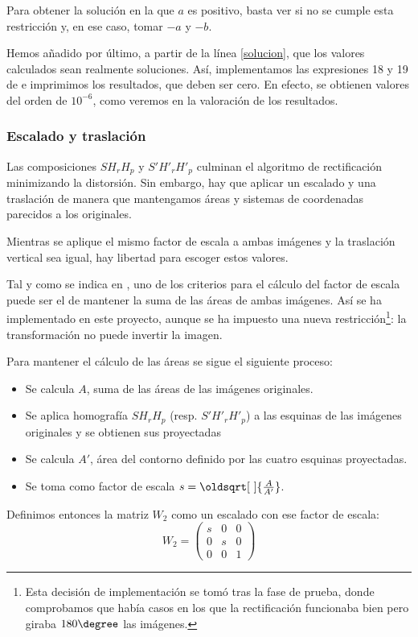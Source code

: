 \documentclass[a4paper, 11pt]{article}
\theoremstyle{definition}
\renewcommand*{\sqrt}[2][\ ]{\oldsqrt[#1]{#2} }
\begin{document}
    Para obtener la solución en la que $a$ es positivo, basta ver si no se cumple esta restricción y, en ese caso, tomar $-a$ y $-b$.

    Hemos añadido por último, a partir de la línea \ref{solucion}, que los valores calculados sean realmente soluciones. Así, implementamos las expresiones 18 y 19 de \cite{LoopZhang} e imprimimos los resultados, que deben ser cero. En efecto, se obtienen valores del orden de $10^{-6}$, como veremos en la valoración de los resultados.

    \subsubsection{Escalado y traslación}
    Las composiciones $S H_r H_p$ y $S' H'_r H'_p$ culminan el algoritmo de rectificación minimizando la distorsión. Sin embargo, hay que aplicar un escalado y una traslación de manera que mantengamos áreas y sistemas de coordenadas parecidos a los originales.

    Mientras se aplique el mismo factor de escala a ambas imágenes y la traslación vertical sea igual, hay libertad para escoger estos valores.

    Tal y como se indica en \cite{LoopZhang}, uno de los criterios para el cálculo del factor de escala puede ser el de mantener la suma de las áreas de ambas imágenes. Así se ha implementado en este proyecto, aunque se ha impuesto una nueva restricción\footnote{Esta decisión de implementación se tomó tras la fase de prueba, donde comprobamos que había casos en los que la rectificación funcionaba bien pero giraba $180\degree$ las imágenes.}: la transformación no puede invertir la imagen.

    Para mantener el cálculo de las áreas se sigue el siguiente proceso:
    \begin{itemize}
        \item Se calcula $A$, suma de las áreas de las imágenes originales.
        \item Se aplica homografía $S H_r H_p$ (resp. $S' H'_r H'_p$) a las esquinas de las imágenes originales y se obtienen sus proyectadas
        \item Se calcula $A'$, área del contorno definido por las cuatro esquinas proyectadas.
        \item Se toma como factor de escala $s = \sqrt{\frac{A}{A'}}$.
    \end{itemize}

    Definimos entonces la matriz $W_2$ como un escalado con ese factor de escala:
    \[
    W_2 = \begin{pmatrix}
        s & 0 & 0 \\
        0 & s & 0 \\
        0 & 0 & 1
    \end{pmatrix}
    \]
\end{document}

